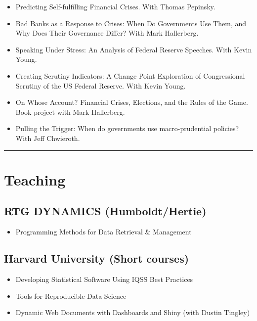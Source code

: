 \documentclass[a4paper]{article}
\begin{document}
\begin{itemize}

    \item Predicting Self-fulfilling Financial Crises. With Thomas Pepinsky.

    \item Bad Banks as a Response to Crises: When Do Governments Use Them, and Why Does Their Governance Differ? With Mark Hallerberg.

    \item Speaking Under Stress: An Analysis of Federal Reserve Speeches. With Kevin Young.

    \item Creating Scrutiny Indicators: A Change Point Exploration of Congressional Scrutiny of the US Federal Reserve. With Kevin Young.

    \item On Whose Account? Financial Crises, Elections, and the Rules of the Game. Book project with Mark Hallerberg.

    \item Pulling the Trigger: When do governments use macro-prudential policies? With Jeff Chwieroth.

\end{itemize}


\vspace{0.25cm}
\medskip\hrule height 1pt
\vspace{0.5cm}

\section*{Teaching}

\subsection*{RTG DYNAMICS (Humboldt/Hertie)}

\begin{itemize}
    \item Programming Methods for Data Retrieval \& Management
\end{itemize}

\subsection*{Harvard University (Short courses)}

\begin{itemize}
    \item Developing Statistical Software Using IQSS Best Practices
    \item Tools for Reproducible Data Science
    \item Dynamic Web Documents with Dashboards and Shiny (with Dustin Tingley)
\end{itemize}
\end{document}
